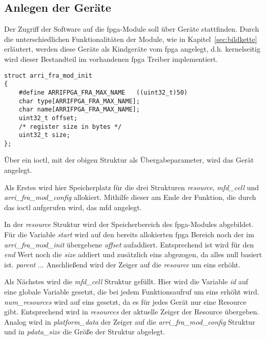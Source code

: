 
\subsection{Anlegen der Geräte}
Der Zugriff der Software auf die \ac{fpga}-Module soll über Geräte stattfinden. Durch die unterschiedlichen Funktionalitäten der Module, wie in Kapitel~\ref{sec:bildkette} erläutert, werden diese Geräte als Kindgeräte vom \ac{fpga} angelegt, d.h. kernelseitig wird dieser Bestandteil im vorhandenen \ac{fpga} Treiber implementiert. 

\begin{lstlisting}
struct arri_fra_mod_init 
{
	#define ARRIFPGA_FRA_MAX_NAME   ((uint32_t)50)
	char type[ARRIFPGA_FRA_MAX_NAME];
	char name[ARRIFPGA_FRA_MAX_NAME];
	uint32_t offset;
	/* register size in bytes */
	uint32_t size;
};
\end{lstlisting}

Über ein \ac{ioctl}, mit der obigen Struktur als Übergabeparameter, wird das Gerät angelegt. 


Als Erstes wird hier Speicherplatz für die drei Strukturen \textit{resource}, \textit{mfd\_cell} und \textit{arri\_fra\_mod\_config} allokiert. Mithilfe dieser am Ende der Funktion, die durch das \ac{ioctl} aufgerufen wird, das \ac{mfd} angelegt.


In der \textit{resource} Struktur wird der Speicherbereich des \ac{fpga}-Modules abgebildet. Für die Variable \textit{start} wird auf den bereits allokierten \ac{fpga} Bereich noch der im \textit{arri\_fra\_mod\_init} übergebene \textit{offset} aufaddiert. Entsprechend ist wird für den \textit{end} Wert noch die \textit{size} addiert und zusätzlich eins abgezogen, da alles null basiert ist. \textit{parent} ... Anschließend wird der Zeiger auf die \textit{resource} um eins erhöht.


Als Nächstes wird die \textit{mfd\_cell} Struktur gefüllt. Hier wird die Variable \textit{id} auf eine globale Variable gesetzt, die bei jedem Funktionsaufruf um eins erhöht wird. \textit{num\_resources} wird auf eins gesetzt, da es für jedes Gerät nur eine Resource gibt. Entsprechend wird in  \textit{resources} der aktuelle Zeiger der Resource übergeben. Analog wird in \textit{platform\_data} der Zeiger auf die \textit{arri\_fra\_mod\_config} Struktur und in \textit{pdata\_size} die Größe der Struktur abgelegt.

